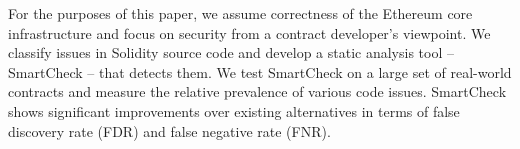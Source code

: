 For the purposes of this paper, we assume correctness of the Ethereum core infrastructure and focus on security from a contract developer's viewpoint.
We classify issues in Solidity source code and develop a static analysis tool -- SmartCheck -- that detects them.
We test SmartCheck on a large set of real-world contracts and measure the relative prevalence of various code issues.
SmartCheck shows significant improvements over existing alternatives in terms of false discovery rate (FDR) and false negative rate (FNR).